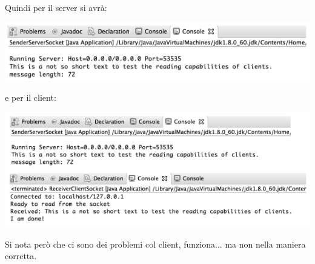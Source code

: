\documentclass[a4paper,12pt, oneside]{book}
\begin{document}
Quindi per il server si avrà:
\begin{center}
\includegraphics[scale=2.5]{img/sc5.png}
\end{center}
e per il client:
\begin{center}
\includegraphics[scale=2.5]{img/sc6.png}
\end{center}
Si nota però che ci sono dei problemi col client, funziona... ma non nella maniera corretta.\\

\end{document}
